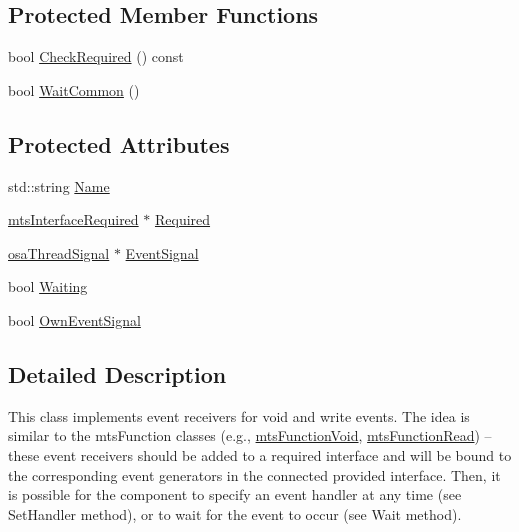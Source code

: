 \subsection*{Protected Member Functions}
\begin{DoxyCompactItemize}
\item 
bool \hyperlink{classmts_event_receiver_base_a3578c0b05513decabb747292174d0d5f}{Check\+Required} () const 
\item 
bool \hyperlink{classmts_event_receiver_base_acf7025608786335eb2113e8a81a9d2dc}{Wait\+Common} ()
\end{DoxyCompactItemize}
\subsection*{Protected Attributes}
\begin{DoxyCompactItemize}
\item 
std\+::string \hyperlink{classmts_event_receiver_base_adfb7eb58f27a2db2bb9bd6b43d50e851}{Name}
\item 
\hyperlink{classmts_interface_required}{mts\+Interface\+Required} $\ast$ \hyperlink{classmts_event_receiver_base_aa614f14ccef40af5bde25c37226d0000}{Required}
\item 
\hyperlink{classosa_thread_signal}{osa\+Thread\+Signal} $\ast$ \hyperlink{classmts_event_receiver_base_a23854ba0cf04b73df856a7f405f30229}{Event\+Signal}
\item 
bool \hyperlink{classmts_event_receiver_base_a962d76302ff233185a6797fed4f7052b}{Waiting}
\item 
bool \hyperlink{classmts_event_receiver_base_a11a6911351875c41dce67ea5b3fb59fd}{Own\+Event\+Signal}
\end{DoxyCompactItemize}


\subsection{Detailed Description}
This class implements event receivers for void and write events. The idea is similar to the mts\+Function classes (e.\+g., \hyperlink{classmts_function_void}{mts\+Function\+Void}, \hyperlink{classmts_function_read}{mts\+Function\+Read}) -- these event receivers should be added to a required interface and will be bound to the corresponding event generators in the connected provided interface. Then, it is possible for the component to specify an event handler at any time (see Set\+Handler method), or to wait for the event to occur (see Wait method).

